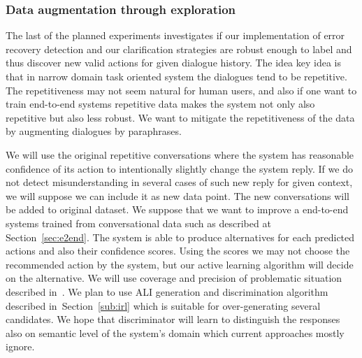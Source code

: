 \documentclass[11pt]{article}
\begin{document}
\subsubsection*{Data augmentation through exploration}
The last of the planned experiments investigates if our implementation of error recovery detection and our clarification strategies are robust enough to label and thus discover new valid actions for given dialogue history.
The idea key idea is that in narrow domain task oriented system the dialogues tend to be repetitive.
The repetitiveness may not seem natural for human users, and also if one want to train end-to-end systems repetitive data makes the system not only also repetitive but also less robust. 
We want to mitigate the repetitiveness of the data by augmenting dialogues by paraphrases.

We will use the original repetitive conversations where the system has reasonable confidence of its action to intentionally slightly change the system reply.
If we do not detect misunderstanding in several cases of such new reply for given context, we will suppose we can include it as new data point. 
The new conversations will be added to original dataset.
We suppose that we want to improve a end-to-end systems trained from conversational data such as described at Section~\ref{sec:e2end}.
The system is able to produce alternatives for each predicted actions and also their confidence scores.
Using the scores we may not choose the recommended action by the system, but our active learning algorithm will decide on the alternative.
We will use coverage and precision of problematic situation described in~\cite{meena_datadriven_2016}.
We plan to use ALI generation and discrimination algorithm described in~Section~\ref{sub:irl} which is suitable for over-generating several candidates.
We hope that discriminator will learn to distinguish the responses also on semantic level of the system's domain which current approaches mostly ignore. 
\end{document}
